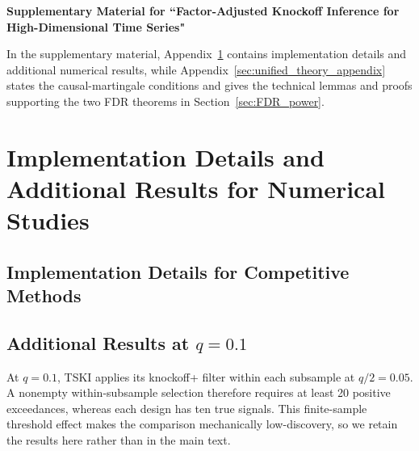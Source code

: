 ﻿\documentclass[12pt]{article}
\newcommand{\0}{\mbox{\bf 0}}
\theoremstyle{plain}%
\theoremstyle{definition}
\begin{document}
{%

 \newpage \appendix

\singlespacing 
\setcounter{page}{1}

\begin{center}

         \textbf{\large {Supplementary Material for ``Factor-Adjusted Knockoff Inference for High-Dimensional Time Series"}}
	
	\bigskip
 
\end{center}

In the supplementary material, Appendix~\ref{sec:details} contains
implementation details and additional numerical results, while
Appendix~\ref{sec:unified_theory_appendix} states the causal-martingale
conditions and gives the technical lemmas and proofs supporting the two FDR
theorems in Section~\ref{sec:FDR_power}.


\section{Implementation Details and Additional Results for Numerical Studies}\label{sec:details}



\subsection{Implementation Details for Competitive Methods} \label{sec:implementation}



\subsection{Additional Results at $q=0.1$}
\label{app:q01_results}
{\color{minorrevisionred}
At $q=0.1$, TSKI applies its knockoff+ filter within each subsample at
$q/2=0.05$. A nonempty within-subsample selection therefore requires at least
20 positive exceedances, whereas each design has ten true signals. This
finite-sample threshold effect makes the comparison mechanically
low-discovery, so we retain the results here rather than in the main text.

}}
\end{document}
